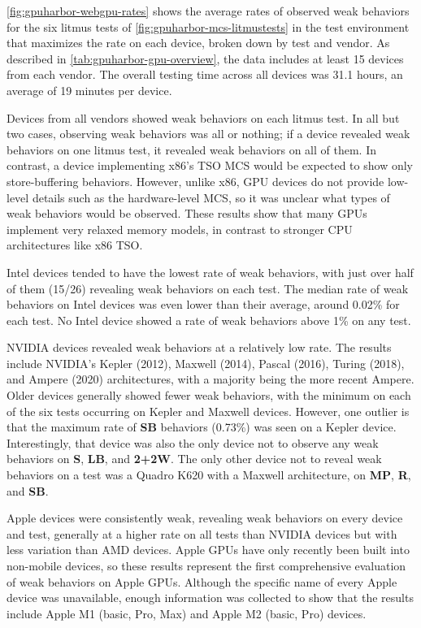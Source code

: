 \myfiglong\ref{fig:gpuharbor-webgpu-rates} shows the average rates of observed weak behaviors for the six litmus tests of \myfig\ref{fig:gpuharbor-mcs-litmustests} in the test environment that maximizes the rate on each device, broken down by test and vendor. As described in \mytab\ref{tab:gpuharbor-gpu-overview}, the data includes at least 15 devices from each vendor. The overall testing time across all \webGPUDevices devices was 31.1 hours, an average of 19 minutes per device.

Devices from all vendors showed weak behaviors on each litmus test. In all but two cases, observing weak behaviors was all or nothing; if a device revealed weak behaviors on one litmus test, it revealed weak behaviors on all of them. In contrast, a device implementing x86's TSO MCS would be expected to show only store-buffering behaviors. However, unlike x86, GPU devices do not provide low-level details such as the hardware-level MCS, so it was unclear what types of weak behaviors would be observed. These results show that many GPUs implement very relaxed memory models, in contrast to stronger CPU architectures like x86 TSO.

Intel devices tended to have the lowest rate of weak behaviors, with just over half of them (15/26) revealing weak behaviors on each test. The median rate of weak behaviors on Intel devices was even lower than their average, around 0.02\% for each test. No Intel device showed a rate of weak behaviors above 1\% on any test.

NVIDIA devices revealed weak behaviors at a relatively low rate. The results include NVIDIA's Kepler (2012), Maxwell (2014), Pascal (2016), Turing (2018), and Ampere (2020) architectures, with a majority being the more recent Ampere. Older devices generally showed fewer weak behaviors, with the minimum on each of the six tests occurring on Kepler and Maxwell devices. However, one outlier is that the maximum rate of \textbf{SB} behaviors (0.73\%) was seen on a Kepler device. Interestingly, that device was also the only device not to observe any weak behaviors on \textbf{S}, \textbf{LB}, and \textbf{2+2W}. The only other device not to reveal weak behaviors on a test was a Quadro K620 with a Maxwell architecture, on \textbf{MP}, \textbf{R}, and \textbf{SB}.

Apple devices were consistently weak, revealing weak behaviors on every device and test, generally at a higher rate on all tests than NVIDIA devices but with less variation than AMD devices. Apple GPUs have only recently been built into non-mobile devices, so these results represent the first comprehensive evaluation of weak behaviors on Apple GPUs. Although the specific name of every Apple device was unavailable, enough information was collected to show that the results include Apple M1 (basic, Pro, Max) and Apple M2 (basic, Pro) devices.

